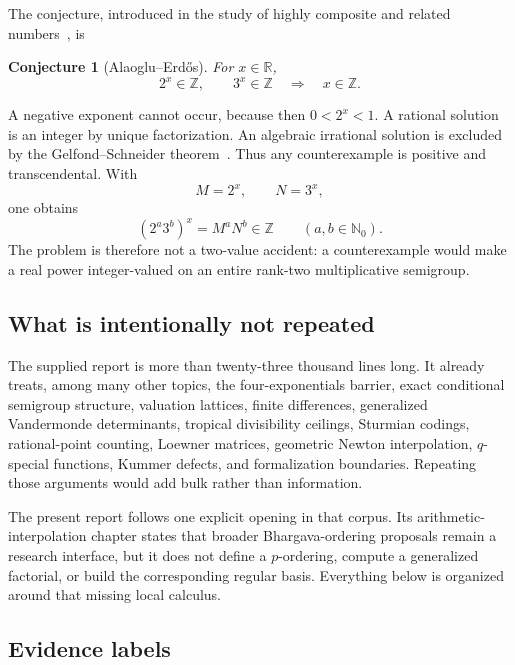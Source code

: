 \documentclass[11pt,oneside]{article}
\newtheorem{conjecture}[theorem]{Conjecture}
\theoremstyle{definition}
\theoremstyle{remark}
\newcommand{\Nzero}{\mathbb N_0}
\newcommand{\Z}{\mathbb Z}
\newcommand{\R}{\mathbb R}
\begin{document}
The conjecture, introduced in the study of highly composite and related numbers~\cite{AE1944}, is
\begin{conjecture}[Alaoglu--Erd\H{o}s]
\label{conj:AE}
For \(x\in\R\),
\[
  2^x\in\Z,\qquad 3^x\in\Z
  \quad\Longrightarrow\quad
  x\in\Z.
\]
\end{conjecture}
A negative exponent cannot occur, because then \(0<2^x<1\).  A rational solution is an
integer by unique factorization.  An algebraic irrational solution is excluded by the
Gelfond--Schneider theorem~\cite{Baker1975}.  Thus any counterexample is positive and transcendental.  With
\[
  M=2^x,\qquad N=3^x,
\]
one obtains
\begin{equation}
 (2^a3^b)^x=M^aN^b\in\Z
 \qquad(a,b\in\Nzero).
 \label{eq:semigroup-power}
\end{equation}
The problem is therefore not a two-value accident: a counterexample would make a real power
integer-valued on an entire rank-two multiplicative semigroup.

\subsection{What is intentionally not repeated}

The supplied report is more than twenty-three thousand lines long.  It already treats, among
many other topics, the four-exponentials barrier, exact conditional semigroup structure,
valuation lattices, finite differences, generalized Vandermonde determinants, tropical
divisibility ceilings, Sturmian codings, rational-point counting, Loewner matrices, geometric
Newton interpolation, \(q\)-special functions, Kummer defects, and formalization boundaries.
Repeating those arguments would add bulk rather than information.

The present report follows one explicit opening in that corpus.  Its arithmetic-interpolation
chapter states that broader Bhargava-ordering proposals remain a research interface, but it
does not define a \(p\)-ordering, compute a generalized factorial, or build the corresponding
regular basis.  Everything below is organized around that missing local calculus.

\subsection{Evidence labels}
\end{document}
